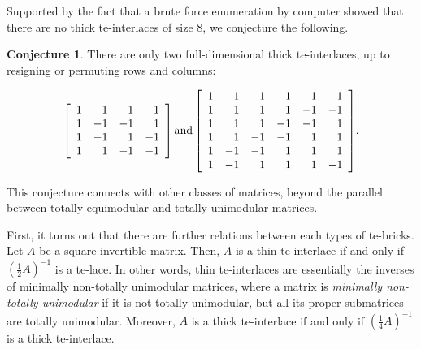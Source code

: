 \documentclass[11pt,a4paper]{amsart}
\theoremstyle{plain}
\theoremstyle{definition}
\newtheorem{conjecture}[theorem]{Conjecture}%
\begin{document}
Supported by the fact that a brute force enumeration by computer showed that there are no thick te-interlaces of size $8$, we conjecture the following.
\begin{conjecture}\label{conjecture:size_thick_te-interlaces}
	There are only two full-dimensional thick te-interlaces, up to resigning or permuting rows and columns:
	
		$${\left[\begin{array}{rrrr}
				1&1&1&1\\
				1&-1&-1&1\\
				1&-1&1&-1\\
				1&1&-1&-1
			\end{array}\right]\text{\normalsize and}\left[\begin{array}{rrrrrr}
				1&1&1&1&1&1\\
				1&1&1&1&-1&-1\\
				1&1&1&-1&-1&1\\
				1&1&-1&-1&1&1\\
				1&-1&-1&1&1&1\\
				1&-1&1&1&1&-1
			\end{array}\right]}.$$
	\end{conjecture}
	This conjecture connects with other classes of matrices, beyond the parallel between totally equimodular and totally unimodular matrices.
	
	First, it turns out that there are further relations between each types of te-bricks.
	Let $A$ be a square invertible matrix. Then, $A$ is a thin te-interlace if and only if $\left(\frac{1}{2}A\right)^{-1}$ is a te-lace.
	In other words, thin te-interlaces are essentially the inverses of minimally non-totally unimodular matrices, where a matrix is \emph{minimally non-totally unimodular} if it is not totally unimodular, but all its proper submatrices are totally unimodular.
	Moreover, $A$ is a thick te-interlace if and only if $\left(\frac{1}{4}A\right)^{-1}$ is a thick te-interlace.
	
\end{document}
